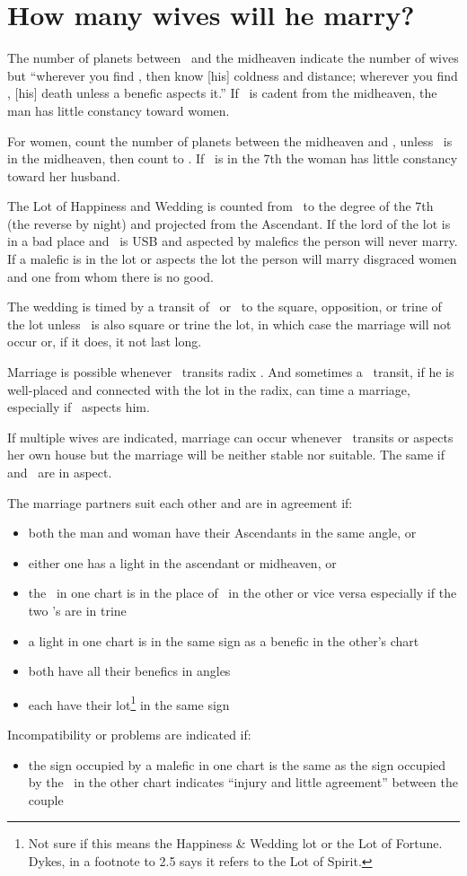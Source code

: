 \section{How many wives will he marry?}

The number of planets between \Venus\, and the midheaven indicate the number of wives but ``wherever you find \Saturn, then know [his] coldness and distance; wherever you find \Mars, [his] death unless a benefic aspects it.'' If \Venus\, is cadent from the midheaven, the man has little constancy toward women.

For women, count the number of planets between the midheaven and \Mars, unless \Mars\, is in the midheaven, then count to \Jupiter.  If \Mars\, is in the 7th the woman has little constancy toward her husband.

The Lot of Happiness and Wedding is counted from \Venus\, to the degree of the 7th (the reverse by night) and projected from the Ascendant.  If the lord of the lot is in a bad place and \Venus\, is USB and aspected by malefics the person will never marry. If a malefic is in the lot or aspects the lot the person will marry disgraced women and one from whom there is no good.

The wedding is timed by a transit of \Jupiter\, or \Venus\, to the square, opposition, or trine of the lot unless \Saturn\, is also square or trine the lot, in which case the marriage will not occur or, if it does, it not last long.

Marriage is possible whenever \Jupiter\, transits radix \Venus. And sometimes a \Saturn\, transit, if he is well-placed and connected with the lot in the radix, can time a marriage, especially if \Jupiter\, aspects him.

If multiple wives are indicated, marriage can occur whenever \Venus\, transits or aspects her own house but the marriage will be neither stable nor suitable. The same if \Venus\, and \Mars\, are in aspect.

The marriage partners suit each other and are in agreement if:
\begin{itemize}[topsep=0em,itemsep=0em]
\item both the man and woman have their Ascendants in the same angle, or 
\item either one has a light in the ascendant or midheaven, or 
\item the \Moon\, in one chart is in the place of \Venus\, in the other or vice versa especially if the two \Moon's are in trine
\item a light in one chart is in the same sign as a benefic in the other's chart
\item both have all their benefics in angles
\item each have their lot\footnote{Not sure if this means the Happiness \& Wedding lot or the Lot of Fortune. Dykes, in a footnote to 2.5 says it refers to the Lot of Spirit.} in the same sign
\end{itemize}

Incompatibility or problems are indicated if:
\begin{itemize}[topsep=0em,itemsep=0em]
\item the sign occupied by a malefic in one chart is the same as the sign occupied by the \Moon\, in the other chart indicates ``injury and little agreement'' between the couple
\end{itemize}
